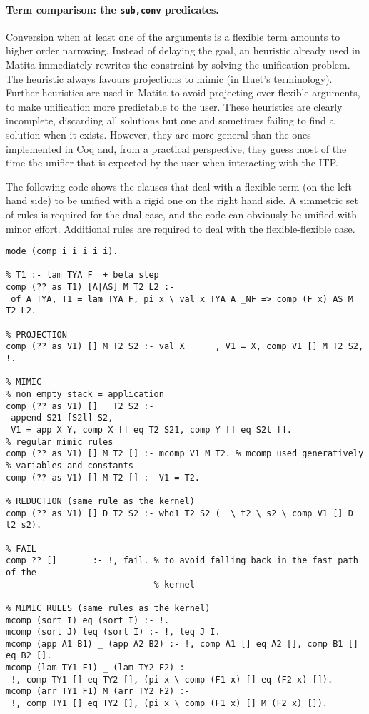 \documentclass{easychair}
\begin{document}
\paragraph{Term comparison: the \texttt{sub,conv} predicates.}

Conversion when at least one of the arguments is a flexible term amounts to higher order narrowing. Instead of delaying the goal, an heuristic already used in Matita immediately rewrites the constraint by solving the unification problem. The heuristic always favours projections to mimic (in Huet's terminology). Further heuristics are used in Matita to avoid projecting over flexible arguments, to make unification more predictable to the user. These heuristics are clearly incomplete, discarding all solutions but one and sometimes failing to find a solution when it exists. However, they are more general than the ones implemented in Coq and, from a practical perspective, they guess most of the time the unifier that is expected by the user when interacting with the ITP.

The following code shows the clauses that deal with a flexible term (on the left hand side) to be unified with a rigid one on the right hand side. A simmetric set of rules is required for the dual case, and the code can obviously be unified with minor effort. Additional rules are required to deal with the flexible-flexible case.

\begin{verbatim}
mode (comp i i i i i).

% T1 :- lam TYA F  + beta step
comp (?? as T1) [A|AS] M T2 L2 :-
 of A TYA, T1 = lam TYA F, pi x \ val x TYA A _NF => comp (F x) AS M T2 L2.

% PROJECTION
comp (?? as V1) [] M T2 S2 :- val X _ _ _, V1 = X, comp V1 [] M T2 S2, !.

% MIMIC
% non empty stack = application
comp (?? as V1) [] _ T2 S2 :-
 append S21 [S2l] S2,
 V1 = app X Y, comp X [] eq T2 S21, comp Y [] eq S2l [].
% regular mimic rules
comp (?? as V1) [] M T2 [] :- mcomp V1 M T2. % mcomp used generatively
% variables and constants
comp (?? as V1) [] M T2 [] :- V1 = T2.

% REDUCTION (same rule as the kernel)
comp (?? as V1) [] D T2 S2 :- whd1 T2 S2 (_ \ t2 \ s2 \ comp V1 [] D t2 s2).

% FAIL
comp ?? [] _ _ _ :- !, fail. % to avoid falling back in the fast path of the
                             % kernel

% MIMIC RULES (same rules as the kernel)
mcomp (sort I) eq (sort I) :- !.
mcomp (sort J) leq (sort I) :- !, leq J I.
mcomp (app A1 B1) _ (app A2 B2) :- !, comp A1 [] eq A2 [], comp B1 [] eq B2 [].
mcomp (lam TY1 F1) _ (lam TY2 F2) :-
 !, comp TY1 [] eq TY2 [], (pi x \ comp (F1 x) [] eq (F2 x) []).
mcomp (arr TY1 F1) M (arr TY2 F2) :-
 !, comp TY1 [] eq TY2 [], (pi x \ comp (F1 x) [] M (F2 x) []).
\end{verbatim}
\end{document}
